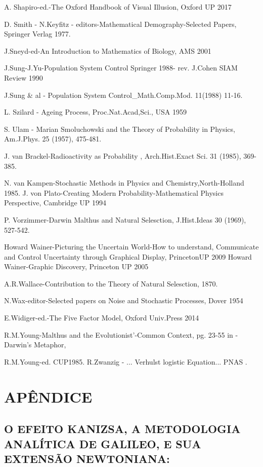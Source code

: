 A. Shapiro-ed.-The Oxford Handbook of Visual Illusion, Oxford UP 2017 

D. Smith - N.Keyfitz - editors-Mathematical Demography-Selected Papers, Springer Verlag 1977.

J.Sneyd-ed-An Introduction to Mathematics of Biology, AMS 2001 

J.Sung-J.Yu-Population System Control Springer 1988- rev. J.Cohen SIAM Review 1990 

J.Sung \& al - Population System Control\_Math.Comp.Mod. 11(1988) 11-16. 

L. Szilard - Ageing Process, Proc.Nat.Acad,Sci., USA 1959 

S. Ulam - Marian Smoluchowski and the Theory of Probability in Physics, Am.J.Phys. 25 (1957), 475-481. 

J. van Brackel-Radioactivity as Probability , Arch.Hist.Exact Sci. 31 (1985), 369-385. 

N. van Kampen-Stochastic Methods in Physics and Chemistry,North-Holland 1985. 
J. von Plato-Creating Modern Probability-Mathematical Physics Perspective, Cambridge UP 1994 

P. Vorzimmer-Darwin Malthus and Natural Selesction, J.Hist.Ideas 30 (1969), 527-542. 

Howard Wainer-Picturing the Uncertain World-How to understand, Communicate and Control Uncertainty through Graphical Display, PrincetonUP 2009 Howard Wainer-Graphic Discovery, Princeton UP 2005 

A.R.Wallace-Contribution to the Theory of Natural Selesction, 1870. 

N.Wax-editor-Selected papers on Noise and Stochastic Processes, Dover 1954 

E.Widiger-ed.-The Five Factor Model, Oxford Univ.Press 2014 

R.M.Young-Malthus and the Evolutionist’-Common Context, pg. 23-55 in - Darwin’s Metaphor, 

R.M.Young-ed. CUP1985. R.Zwanzig - ... Verhulst logistic Equation... PNAS . 

\chapter{APÊNDICE}

\section{O EFEITO KANIZSA, A METODOLOGIA ANALÍTICA DE GALILEO, E SUA EXTENSÃO NEWTONIANA:}

